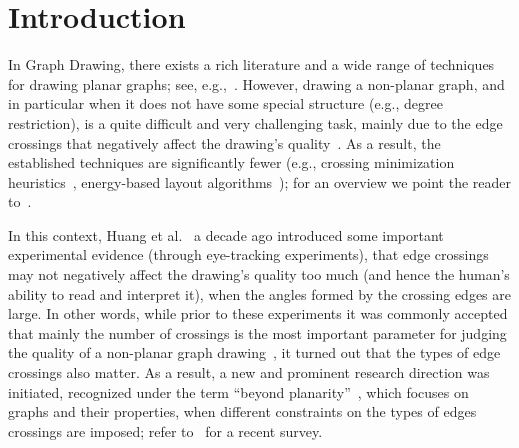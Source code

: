 \documentclass{comjnl}
\begin{document}
\maketitle

\section{Introduction}
\label{sec:introduction}

In Graph Drawing, there exists a rich literature and a wide range of techniques for drawing planar graphs; see, e.g.,~\cite{DBLP:journals/combinatorica/FraysseixPP90,DBLP:conf/gd/GutwengerM98,DBLP:journals/algorithmica/Kant96}. However, drawing a non-planar graph, and in particular when it does not have some special structure (e.g., degree restriction), is a quite difficult and very challenging task, mainly due to the edge crossings that negatively affect the drawing's quality~\cite{DBLP:journals/iwc/Purchase00}. As a result, the established techniques are significantly fewer (e.g., crossing minimization heuristics~\cite{DBLP:journals/algorithmica/EadesW94,DBLP:journals/tsmc/SugiyamaTT81}, energy-based layout algorithms~\cite{DBLP:journals/congnum/Eades84,DBLP:journals/spe/FruchtermanR91}); for an overview we point the reader to~\cite{DBLP:books/ph/BattistaETT99,DBLP:conf/dagstuhl/1999dg,DBLP:reference/crc/2013gd}.

In this context, Huang et al.~\cite{DBLP:conf/apvis/Huang07,DBLP:journals/vlc/HuangEH14} a decade ago introduced some important experimental evidence (through eye-tracking experiments), that edge crossings may not negatively affect the drawing's quality too much (and hence the human's ability to read and interpret it), when the angles formed by the crossing edges are large. In other words, while prior to these experiments it was commonly accepted that mainly the number of crossings is the most important parameter for judging the quality of a non-planar graph drawing~\cite{DBLP:conf/gd/Purchase97,DBLP:journals/iwc/Purchase00}, it turned out that the types of edge crossings also matter. As a result, a new and prominent research direction was initiated, recognized under the term ``beyond planarity''~\cite{Shonan2016,Dagstuhl2016,SoCG2017}, which focuses on graphs and their properties, when different constraints on the types of edges crossings are imposed; refer to~\cite{DBLP:journals/corr/abs-1804-07257} for a recent survey.
\end{document}
